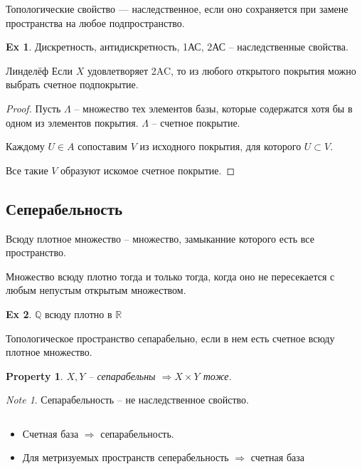 \documentclass[11pt]{book}
\newcommand{\R}{\mathbb{R}}
\newcommand{\Q}{\mathbb{Q}}
\theoremstyle{definition}
\theoremstyle{plain}
\theoremstyle{plain}
\newtheorem*{prop}{Property}
\theoremstyle{definition}
\newtheorem*{ex}{Ex}
\theoremstyle{remark}
\newtheorem*{note}{Note}
\begin{document}
\begin{defn}
    Топологические свойство --- наследственное, если оно сохраняется при замене пространства на любое подпространство.
\end{defn}
\begin{ex}
    Дискретность, антидискретность, 1АС, 2АС -- наследственные свойства.
\end{ex}
\begin{thm}{Линделёф}
    Если $ X$ удовлетворяет 2AC, то из любого открытого покрытия можно выбрать счетное подпокрытие.
\end{thm}
\begin{proof}
    Пусть  $ \Lambda $ -- множество тех элементов базы, которые содержатся хотя бы в одном из элементов покрытия. $ \Lambda$ -- счетное покрытие.

    Каждому $ U \in A$ сопоставим $ V$ из исходного покрытия, для которого  $ U \subset V$.

    Все такие $ V$ образуют искомое счетное покрытие.
\end{proof}
\subsection{Сеперабельность}
\begin{defn}
    Всюду плотное множество -- множество, замыканние которого есть все пространство.
\end{defn}
\begin{defn}
    Множество всюду плотно тогда и только тогда, когда оно не пересекается с любым непустым открытым множеством.
\end{defn}
\begin{ex}
    $ \Q$ всюду плотно в $ \R$
\end{ex}
\begin{defn}
    Топологическое пространство сепарабельно, если в нем есть счетное всюду плотное множество.
\end{defn}
\begin{prop}
    $ X, Y$ -- сепарабельны $ \Longrightarrow  X \times Y$  тоже.
\end{prop}
\begin{note}
    Сепарабельность -- не наследственное свойство.
\end{note}
\begin{thm}$ $
    \begin{itemize}
	\item Счетная база $ \Longrightarrow  $ сепарабельность.
	\item Для метризуемых пространств сеперабельность $\Longrightarrow$ счетная база
    \end{itemize}
\end{thm}
\end{document}
